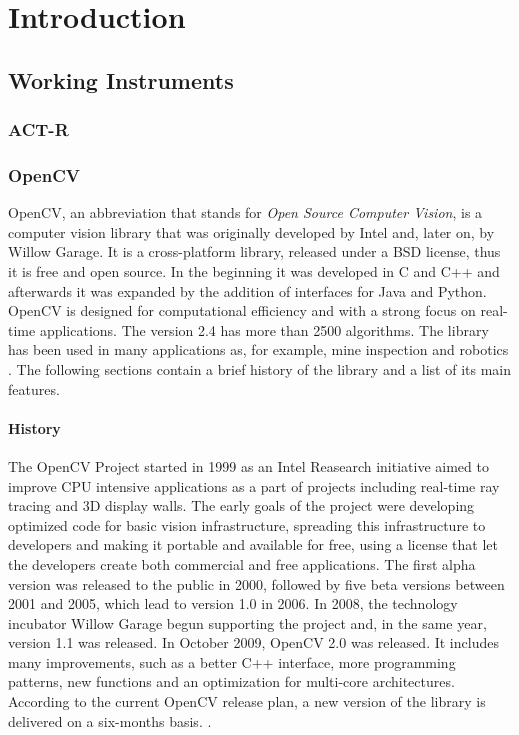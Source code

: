 \chapter{Introduction}
\section{Working Instruments}

\subsection{ACT-R}

\subsection{OpenCV}
	OpenCV, an abbreviation that stands for \emph{Open Source Computer Vision}, is a computer vision library that was originally developed by Intel and, later on, by Willow Garage.
	It is a cross-platform library, released under a BSD license, thus it is free and open source. In the beginning it was developed in C and C++ and afterwards it was expanded by the addition of interfaces for Java and Python. OpenCV is designed for computational efficiency and with a strong focus on real-time applications. The version 2.4 has more than 2500 algorithms. The library has been used in many applications as, for example, mine inspection and robotics \cite{OpenCV:MainWebPage}. The following sections contain a brief history of the library and a list of its main features.
		
	\subsubsection*{History}
	The OpenCV Project started in 1999 as an Intel Reasearch initiative aimed to improve CPU intensive applications as a part of projects including real-time ray tracing and 3D display walls. The early goals of the project were developing optimized code for basic vision infrastructure, spreading this infrastructure to developers and making it portable and available for free, using a license that let the developers create both commercial and free applications.\newline
	The first alpha version was released to the public in 2000, followed by five beta versions between 2001 and 2005, which lead to version 1.0 in 2006. In 2008, the technology incubator Willow Garage begun supporting the project and, in the same year, version 1.1  was released.
	In October 2009, OpenCV 2.0 was released. It includes many improvements, such as a better C++ interface, more programming patterns, new functions and an optimization for multi-core architectures. According to the current OpenCV release plan, a new version of the library is delivered on a six-months basis. \cite{OpenCV:ChangeLogs}.
	
